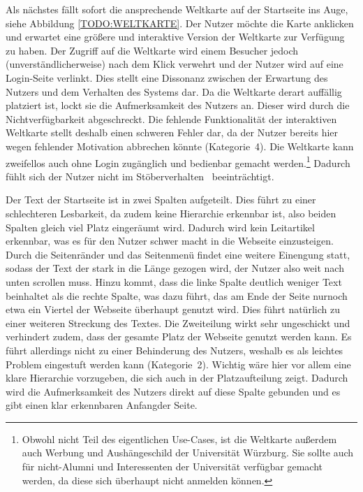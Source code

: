 {Als nächstes fällt sofort die ansprechende Weltkarte auf der Startseite ins Auge, siehe Abbildung \ref{TODO:WELTKARTE}. 
Der Nutzer möchte die Karte anklicken und erwartet eine größere und interaktive Version der Weltkarte zur Verfügung zu haben.
Der Zugriff auf die Weltkarte wird einem Besucher jedoch (unverständlicherweise) nach dem Klick verwehrt und der Nutzer wird auf eine Login-Seite verlinkt. 
Dies stellt eine Dissonanz zwischen der Erwartung des Nutzers und dem Verhalten des Systems dar.
}{Da die Weltkarte derart auffällig platziert ist, lockt sie die Aufmerksamkeit des Nutzers an. Dieser wird durch die Nichtverfügbarkeit abgeschreckt. 
Die fehlende Funktionalität der interaktiven Weltkarte stellt deshalb einen schweren Fehler dar, da der Nutzer bereits hier wegen fehlender Motivation abbrechen könnte (Kategorie~4).}
{Die Weltkarte kann zweifellos auch ohne Login zugänglich und bedienbar gemacht werden.\footnote{Obwohl nicht Teil des eigentlichen Use-Cases, ist die Weltkarte außerdem auch Werbung und Aushängeschild der Universität Würzburg. Sie sollte auch für nicht-Alumni und Interessenten der Universität verfügbar gemacht werden, da diese sich überhaupt nicht anmelden können.}
Dadurch fühlt sich der Nutzer nicht im \glqq Stöberverhalten\grqq~ beeinträchtigt.
}\label{prob:start:weltkarte}

{Der Text der Startseite ist in zwei Spalten aufgeteilt. Dies führt zu einer schlechteren Lesbarkeit, da zudem keine Hierarchie erkennbar ist, also beiden Spalten gleich viel Platz eingeräumt wird.
Dadurch wird kein Leitartikel erkennbar, was es für den Nutzer schwer macht in die Webseite einzusteigen. 
Durch die Seitenränder und das Seitenmenü findet eine weitere Einengung statt, sodass der Text der stark in die Länge gezogen wird, der Nutzer also weit nach unten scrollen muss.
Hinzu kommt, dass die linke Spalte deutlich weniger Text beinhaltet als die rechte Spalte, was dazu führt, das am Ende der Seite nurnoch etwa ein Viertel der Webseite überhaupt genutzt wird. Dies führt natürlich zu einer weiteren Streckung des Textes. 
}{Die Zweiteilung wirkt sehr ungeschickt und verhindert zudem, dass der gesamte Platz der Webseite genutzt werden kann. Es führt allerdings nicht zu einer Behinderung des Nutzers, weshalb es als leichtes Problem eingestuft werden kann (Kategorie~2).
}{Wichtig wäre hier vor allem eine klare Hierarchie vorzugeben, die sich auch in der Platzaufteilung zeigt. Dadurch wird die Aufmerksamkeit des Nutzers direkt auf diese Spalte gebunden und es gibt einen klar erkennbaren \glqq Anfang\grqq der Seite.}

